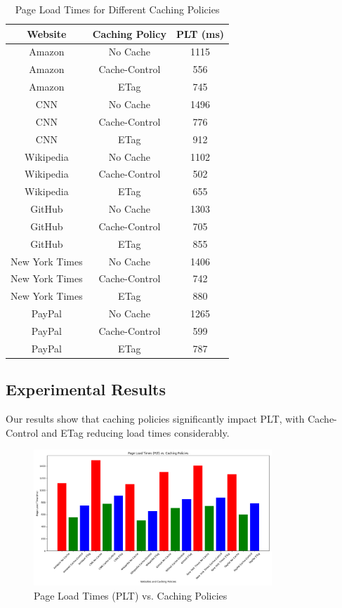 \documentclass[a4paper,10pt]{article}
\begin{document}
\begin{table}[H]
\centering
\begin{tabular}{|c|c|c|}
\hline
\textbf{Website} & \textbf{Caching Policy} & \textbf{PLT (ms)} \\
\hline
Amazon & No Cache & 1115 \\
Amazon & Cache-Control & 556 \\
Amazon & ETag & 745 \\
CNN & No Cache & 1496 \\
CNN & Cache-Control & 776 \\
CNN & ETag & 912 \\
Wikipedia & No Cache & 1102 \\
Wikipedia & Cache-Control & 502 \\
Wikipedia & ETag & 655 \\
GitHub & No Cache & 1303 \\
GitHub & Cache-Control & 705 \\
GitHub & ETag & 855 \\
New York Times & No Cache & 1406 \\
New York Times & Cache-Control & 742 \\
New York Times & ETag & 880 \\
PayPal & No Cache & 1265 \\
PayPal & Cache-Control & 599 \\
PayPal & ETag & 787 \\
\hline
\end{tabular}
\caption{Page Load Times for Different Caching Policies}
\label{tab:caching_policies}
\end{table}

\subsection{Experimental Results}
Our results show that caching policies significantly impact PLT, with Cache-Control and ETag reducing load times considerably.

\begin{figure}[ht]
\centering
\includegraphics[width=0.8\textwidth]{plt_vs_caching.png}
\caption{Page Load Times (PLT) vs. Caching Policies}
\label{fig:plt-vs-caching}
\end{figure}
\end{document}
